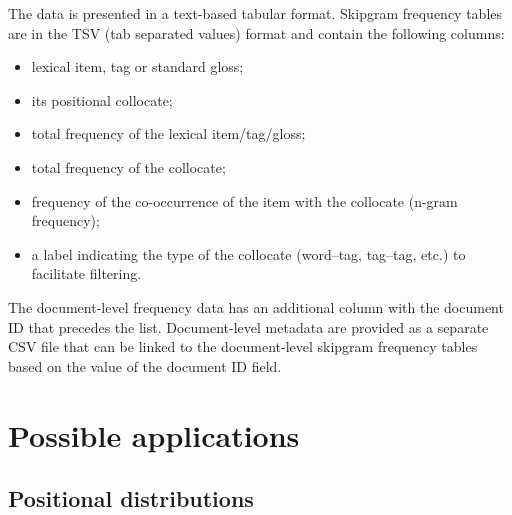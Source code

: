 \documentclass[12pt]{article}
\begin{document}
The data is presented in a text-based tabular format. Skipgram
frequency tables are in the TSV (tab separated values) format and
contain the following columns:
\begin{itemize}
\item lexical item, tag or standard gloss;
\item its positional collocate;
\item total frequency of the lexical item/tag/gloss;
\item total frequency of the collocate;
\item frequency of the co-occurrence of the item with the collocate
  (n-gram frequency);
\item a label indicating the type of the collocate (word--tag,
  tag--tag, etc.) to facilitate filtering.
\end{itemize}
The document-level frequency data has an additional column with the
document ID that precedes the list.  Document-level metadata are provided
as a separate CSV file that can be linked to the document-level
skipgram frequency tables based on the value of the document ID
field. 



\section{Possible applications}
\label{sec:applications}


\subsection{Positional distributions}



\end{document}
